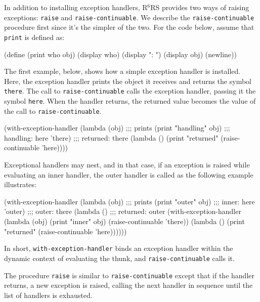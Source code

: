\documentclass[onecolumn, 12pt, twoside, openright, dvipdfm]{book}
\newcommand{\rnrs}[1]{R$^{\mathrm{#1}}$RS}
\begin{document}
In addition to installing exception handlers, \rnrs{6} provides two
ways of raising exceptions: \texttt{raise} and
\texttt{raise-continuable}.  We describe the 
\texttt{raise-continuable} procedure
first since it's the simpler of the two.  
For the code below, assume that \texttt{print} is defined as:
\begin{CodeInline}
(define (print who obj)
  (display who) 
  (display ": ")
  (display obj)
  (newline))
\end{CodeInline}

The first example, below, shows how a simple exception handler is
installed.  Here, the exception handler prints the object it
receives and returns the symbol \texttt{there}.  The call to
\texttt{raise-continuable} calls the exception handler, passing it
the symbol \texttt{here}.  When the handler returns, the returned
value becomes the value of the call to \texttt{raise-continuable}.

\begin{CodeInline}
(with-exception-handler
  (lambda (obj)                         ;;; prints
    (print "handling" obj)              ;;;   handling: here
    'there)                             ;;;   returned: there
  (lambda ()
    (print "returned" (raise-continuable 'here))))
\end{CodeInline}

Exceptional handlers may nest, and in that case, if an exception is
raised while evaluating an inner handler, the outer handler is
called as the following example illustrates:

\begin{CodeInline}
(with-exception-handler
  (lambda (obj)                         ;;; prints
    (print "outer" obj)                 ;;;   inner: here    
    'outer)                             ;;;   outer: there   
  (lambda ()                            ;;;   returned: outer
    (with-exception-handler
      (lambda (obj)
        (print "inner" obj)
        (raise-continuable 'there))
      (lambda ()
        (print "returned" (raise-continuable 'here))))))
\end{CodeInline}

In short, \texttt{with-exception-handler} binds an exception handler
within the dynamic context of evaluating the thunk, and
\texttt{raise-continuable} calls it.

The procedure \texttt{raise} is similar to
\texttt{raise-continuable} except that if the handler returns, a new
exception is raised, calling the next handler in sequence until the
list of handlers is exhausted.
\end{document}
